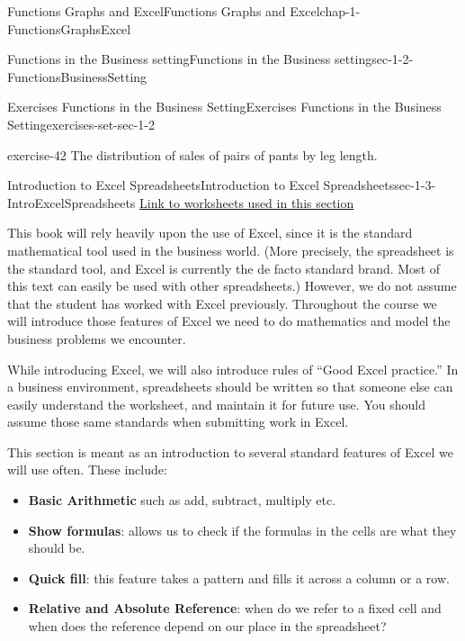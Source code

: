 \documentclass[oneside,10pt,]{book}
\newcommand{\terminology}[1]{\textbf{#1}}
\numberwithin{equation}{section}
\begin{document}
\begin{chapterptx}{Functions Graphs and Excel}{}{Functions Graphs and Excel}{}{}{chap-1-FunctionsGraphsExcel}
\begin{sectionptx}{Functions in the Business setting}{}{Functions in the Business setting}{}{}{sec-1-2-FunctionsBusinessSetting}
\begin{exercises-subsection-numberless}{Exercises  Functions in the Business Setting}{}{Exercises  Functions in the Business Setting}{}{}{exercises-set-sec-1-2}
\begin{divisionexercise}{22}{}{}{exercise-42}%
\hypertarget{p-222}{}%
The distribution of sales of pairs of pants by leg length.%
\end{divisionexercise}%
\end{exercises-subsection-numberless}
\end{sectionptx}
%
%
\typeout{************************************************}
\typeout{************************************************}
%
\begin{sectionptx}{Introduction to Excel Spreadsheets}{}{Introduction to Excel Spreadsheets}{}{}{sec-1-3-IntroExcelSpreadsheets}
\hypertarget{p-223}{}%
\href{./Examples/Section-1-3-Examples.xlsx}{Link to worksheets used in this section}%
\par
\hypertarget{p-224}{}%
This book will rely heavily upon the use of Excel, since it is the standard mathematical tool used in the business world.  (More precisely, the spreadsheet is the standard tool, and Excel is currently the de facto standard brand.  Most of this text can easily be used with other spreadsheets.) However, we do not assume that the student has worked with Excel previously. Throughout the course we will introduce those features of Excel we need to do mathematics and model the business problems we encounter.%
\par
\hypertarget{p-225}{}%
While introducing Excel, we will also introduce rules of “Good Excel practice.”  In a business environment, spreadsheets should be written so that someone else can easily understand the worksheet, and maintain it for future use. You should assume those same standards when submitting work in Excel.%
\par
\hypertarget{p-226}{}%
This section is meant as an introduction to several standard features of Excel we will use often. These include:%
\leavevmode%
\begin{itemize}[label=\textbullet]
\item{}\hypertarget{p-227}{}%
\terminology{Basic Arithmetic} such as add, subtract, multiply etc.%
\item{}\hypertarget{p-228}{}%
\terminology{Show formulas}: allows us to check if the formulas in the cells are what they should be.%
\item{}\hypertarget{p-229}{}%
\terminology{Quick fill}: this feature takes a pattern and fills it across a column or a row.%
\item{}\hypertarget{p-230}{}%
\terminology{Relative and Absolute Reference}: when do we refer to a fixed cell and when does the reference depend on our place in the spreadsheet?%

\end{itemize}
\end{sectionptx}
\end{chapterptx}
\end{document}
